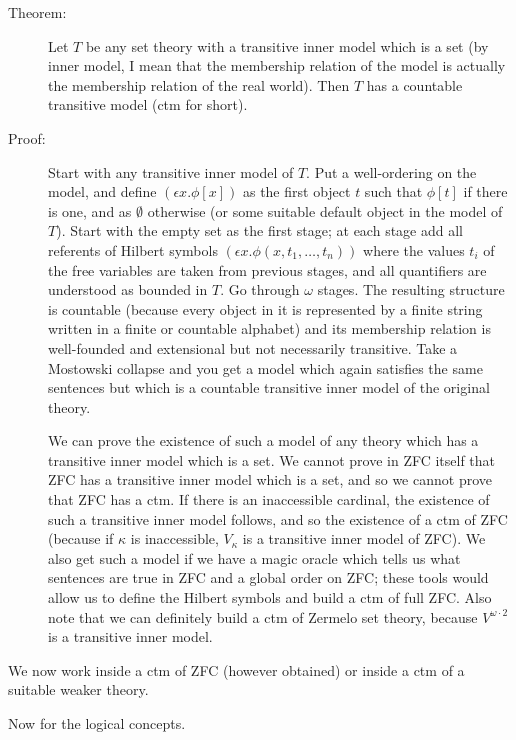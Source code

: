 \documentclass[12pt]{book}
\begin{document}
\begin{description}

\item[Theorem:]  Let $T$ be any set theory with a transitive inner model which is a set (by inner model, I mean that the membership relation of the model is actually the membership relation of the real world). Then $T$ has a countable transitive model (ctm for short). 

\item[Proof:]  Start with any transitive inner model of $T$.  Put a well-ordering on the model, and define $(\epsilon x.\phi[x])$ as the first object $t$
such that $\phi[t]$ if there is one, and as $\emptyset$ otherwise (or some suitable default object in the model of $T$).  Start with the empty set as the first stage;  at each stage add all referents of Hilbert symbols $(\epsilon x.\phi(x,t_1,\ldots,t_n))$ where the values $t_i$ of the free variables are taken from previous stages, and all quantifiers are understood as bounded in $T$.  Go through $\omega$ stages.  The resulting structure is countable (because every object in it is represented by a finite string written in a finite or countable alphabet)  and its membership relation is well-founded and extensional but not necessarily transitive.   Take a Mostowski collapse and you get a model which again satisfies the same sentences but which is a countable transitive inner model of the original theory.

We can prove the existence of such a model of any theory which has a transitive inner model which is a set.  We cannot prove in ZFC itself
that ZFC has a transitive inner model which is a set, and so we cannot prove that ZFC has a ctm.  If there is an inaccessible cardinal, the existence
of such a transitive inner model follows, and so the existence of a ctm of ZFC (because if $\kappa$ is inaccessible, $V_{\kappa}$ is a transitive inner model of ZFC).  We also get such a model if we have a magic oracle which tells us what sentences are true in ZFC and a global order on ZFC;  these tools would allow us to define the Hilbert symbols and build a ctm of full ZFC.  Also note that we can definitely build a ctm of Zermelo set theory, because $V^{\omega\cdot 2}$ is a transitive inner model.

\end{description}

We now work inside a ctm of ZFC (however obtained) or inside a ctm of a suitable weaker theory.

Now for the logical concepts.  
\end{document}
